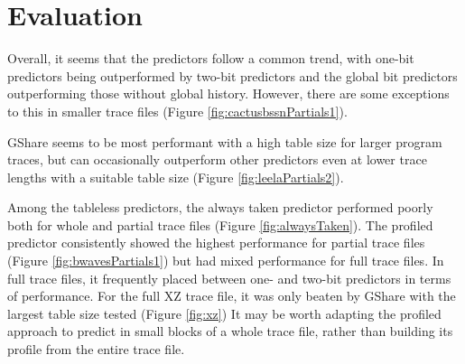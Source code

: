 \section{Evaluation}
Overall, it seems that the predictors follow a common trend, with one-bit predictors being outperformed by two-bit predictors and the global bit predictors outperforming those without global history. However, there are some exceptions to this in smaller trace files (Figure \ref{fig:cactusbssnPartials1}).

GShare seems to be most performant with a high table size for larger program traces, but can occasionally outperform other predictors even at lower trace lengths with a suitable table size (Figure \ref{fig:leelaPartials2}).

Among the tableless predictors, the always taken predictor performed poorly both for whole and partial trace files (Figure \ref{fig:alwaysTaken}). The profiled predictor consistently showed the highest performance for partial trace files (Figure \ref{fig:bwavesPartials1}) but had mixed performance for full trace files. In full trace files, it frequently placed between one- and two-bit predictors in terms of performance. For the full XZ trace file, it was only beaten by GShare with the largest table size tested (Figure \ref{fig:xz}) It may be worth adapting the profiled approach to predict in small blocks of a whole trace file, rather than building its profile from the entire trace file.